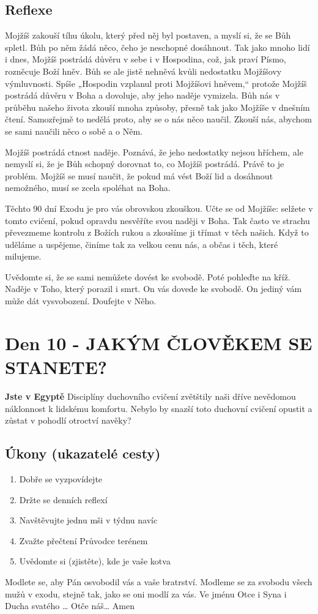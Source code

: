 \documentclass[11pt]{article}
\newcommand{\zacatekDruhyTyden}{
  \textbf{Jste v Egyptě} \newline
  Disciplíny duchovního cvičení zvětštily naši dříve nevědomou náklonnost k lidskému komfortu.
  Nebylo by snazší toto duchovní cvičení opustit a zůstat v pohodlí otroctví navěky?

  \subsection*{Úkony (ukazatelé cesty)}
\begin{enumerate}
  \item Dobře se vyzpovídejte
  \item Držte se denních reflexí
  \item Navštěvujte jednu mši v týdnu navíc
  \item Zvažte přečtení Průvodce terénem
  \item Uvědomte si (zjistěte), kde je vaše kotva
\end{enumerate}
Modlete se, aby Pán osvobodil vás a vaše bratrství. \newline
Modleme se za svobodu všech mužů v exodu, stejně tak, jako se oni modlí za vás.\newline
Ve jménu Otce i Syna i Ducha svatého …  Otče náš… Amen
}
\begin{document}
\subsection*{Reflexe}
Mojžíš zakouší tíhu úkolu, který před něj byl postaven, a myslí si, že se Bůh spletl. Bůh po něm žádá něco,
čeho je neschopné dosáhnout. Tak jako mnoho lidí i dnes, Mojžíš postrádá důvěru v sebe i v Hospodina,
což, jak praví Písmo, rozněcuje Boží hněv. Bůh se ale jistě nehněvá kvůli nedostatku Mojžíšovy
výmluvnosti. Spíše „Hospodin vzplanul proti Mojžíšovi hněvem,“ protože Mojžíš postrádá důvěru v Boha
a dovoluje, aby jeho naděje vymizela. Bůh nás v průběhu našeho života zkouší mnoha způsoby, přesně tak
jako Mojžíše v dnešním čtení. Samozřejmě to nedělá proto, aby se o nás něco naučil. Zkouší nás, abychom
se sami naučili něco o sobě a o Něm.

Mojžíš postrádá ctnost naděje. Poznává, že jeho nedostatky nejsou hříchem, ale nemyslí si, že je Bůh
schopný dorovnat to, co Mojžíš postrádá. Právě to je problém. Mojžíš se musí naučit, že pokud má vést
Boží lid a dosáhnout nemožného, musí se zcela spoléhat na Boha.

Těchto 90 dní Exodu je pro vás obrovskou zkouškou. Učte se od Mojžíše: selžete v tomto cvičení, pokud
opravdu nesvěříte svou naději v Boha. Tak často ve strachu převezmeme kontrolu z Božích rukou a
zkoušíme ji třímat v těch našich. Když to uděláme a uspějeme, činíme tak za velkou cenu nás, a občas i
těch, které milujeme.

Uvědomte si, že se sami nemůžete dovést ke svobodě. Poté pohleďte na kříž. Naděje v Toho, který porazil
i smrt. On vás dovede ke svobodě. On jediný vám může dát vysvobození. Doufejte v Něho.

\newpage
\section{Den 10 - JAKÝM ČLOVĚKEM SE STANETE?}
\zacatekDruhyTyden
\end{document}
